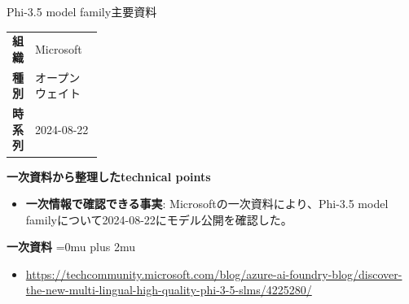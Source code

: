 \begin{technicalnote}{Phi-3.5 model family}{主要資料}
\begingroup
\begin{tabularx}{\linewidth}{@{}>{\bfseries}p{0.22\linewidth}X@{}}
組織 & Microsoft \\
種別 & オープンウェイト \\
時系列 & 2024-08-22 \\
\end{tabularx}
\smallskip
{\bfseries 一次資料から整理したtechnical points}
\begin{itemize}[leftmargin=1.5em,itemsep=0.35em]
\item \textbf{一次情報で確認できる事実}: Microsoftの一次資料により、Phi-3.5 model familyについて2024-08-22にモデル公開を確認した。
\end{itemize}
\begin{minipage}{\linewidth}
\begin{samepage}
{\bfseries 一次資料}
\begingroup\sloppy
\Urlmuskip=0mu plus 2mu\relax
\begin{itemize}[leftmargin=1.5em,itemsep=0.25em]
\item {\scriptsize\url{https://techcommunity.microsoft.com/blog/azure-ai-foundry-blog/discover-the-new-multi-lingual-high-quality-phi-3-5-slms/4225280/}}
\end{itemize}
\endgroup
\end{samepage}
\end{minipage}
\endgroup
\end{technicalnote}
\medskip


